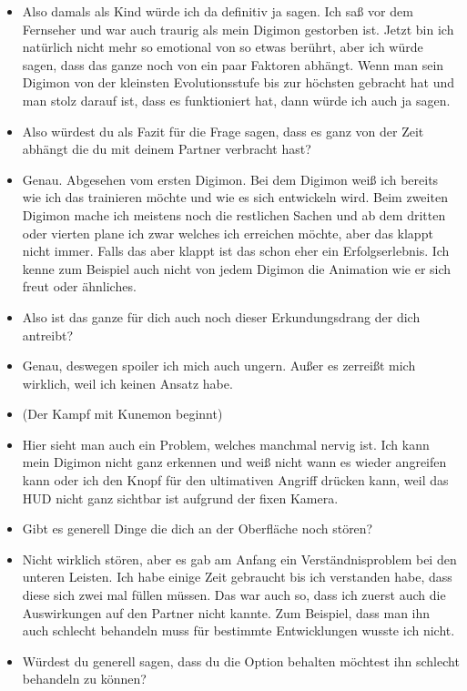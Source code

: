 {\begin{itemize}[]
    \item {} Also damals als Kind würde ich da definitiv ja sagen. Ich saß vor dem Fernseher und war auch traurig als mein Digimon gestorben ist. Jetzt bin ich natürlich nicht mehr so emotional von so etwas berührt, aber ich würde sagen, dass das ganze noch von ein paar Faktoren abhängt. Wenn man sein Digimon von der kleinsten Evolutionsstufe bis zur höchsten gebracht hat und man stolz darauf ist, dass es funktioniert hat, dann würde ich auch ja sagen. 
    \item {} Also würdest du als Fazit für die Frage sagen, dass es ganz von der Zeit abhängt die du mit deinem Partner verbracht hast?
    \item {} Genau. Abgesehen vom ersten Digimon. Bei dem Digimon weiß ich bereits wie ich das trainieren möchte und wie es sich entwickeln wird. Beim zweiten Digimon mache ich meistens noch die restlichen Sachen und ab dem dritten oder vierten plane ich zwar welches ich erreichen möchte, aber das klappt nicht immer. Falls das aber klappt ist das schon eher ein Erfolgserlebnis. Ich kenne zum Beispiel auch nicht von jedem Digimon die Animation wie er sich freut oder ähnliches. 
    \item {} Also ist das ganze für dich auch noch dieser Erkundungsdrang der dich antreibt?
    \item {} Genau, deswegen spoiler ich mich auch ungern. Außer es zerreißt mich wirklich, weil ich keinen Ansatz habe. 
    \item {} (Der Kampf mit Kunemon beginnt)
    \item {} Hier sieht man auch ein Problem, welches manchmal nervig ist. Ich kann mein Digimon nicht ganz erkennen und weiß nicht wann es wieder angreifen kann oder ich den Knopf für den ultimativen Angriff drücken kann, weil das HUD nicht ganz sichtbar ist aufgrund der fixen Kamera. 
    \item {} Gibt es generell Dinge die dich an der Oberfläche noch stören?
    \item {} Nicht wirklich stören, aber es gab am Anfang ein Verständnisproblem bei den unteren Leisten. Ich habe einige Zeit gebraucht bis ich verstanden habe, dass diese sich zwei mal füllen müssen. Das war auch so, dass ich zuerst auch die Auswirkungen auf den Partner nicht kannte. Zum Beispiel, dass man ihn auch schlecht behandeln muss für bestimmte Entwicklungen wusste ich nicht.
    \item {} Würdest du generell sagen, dass du die Option behalten möchtest ihn schlecht behandeln zu können?

\end{itemize}}

